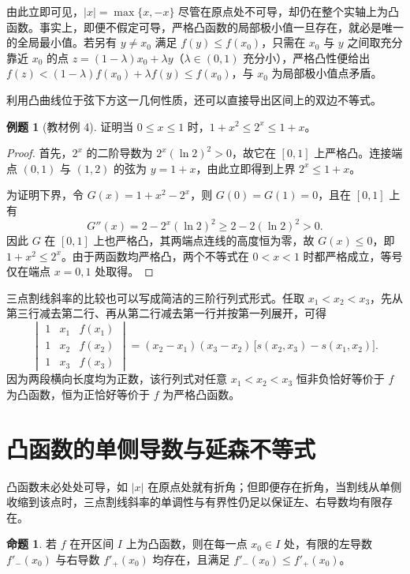\documentclass[UTF8,fontset=fandol,a4paper,12pt]{ctexart}
\theoremstyle{definition}
\newtheorem{proposition}[theorem]{命题}
\newtheorem{example}[theorem]{例题}
\begin{document}
由此立即可见，$|x|=\max\{x,-x\}$ 尽管在原点处不可导，却仍在整个实轴上为凸函数。事实上，即便不假定可导，严格凸函数的局部极小值一旦存在，就必是唯一的全局最小值。若另有 $y\ne x_0$ 满足 $f(y)\le f(x_0)$，只需在 $x_0$ 与 $y$ 之间取充分靠近 $x_0$ 的点 $z=(1-\lambda)x_0+\lambda y$（$\lambda\in(0,1)$ 充分小），严格凸性便给出 $f(z)<(1-\lambda)f(x_0)+\lambda f(y)\le f(x_0)$，与 $x_0$ 为局部极小值点矛盾。

利用凸曲线位于弦下方这一几何性质，还可以直接导出区间上的双边不等式。

\begin{example}[教材例 4]
证明当 $0\le x\le1$ 时，$1+x^2\le 2^x\le 1+x$。
\end{example}

\begin{proof}
首先，$2^x$ 的二阶导数为 $2^x(\ln 2)^2>0$，故它在 $[0,1]$ 上严格凸。连接端点 $(0,1)$ 与 $(1,2)$ 的弦为 $y=1+x$，由此立即得到上界 $2^x\le 1+x$。

为证明下界，令 $G(x)=1+x^2-2^x$，则 $G(0)=G(1)=0$，且在 $[0,1]$ 上有
\[
 G''(x)=2-2^x(\ln 2)^2\ge 2-2(\ln 2)^2>0.
\]
因此 $G$ 在 $[0,1]$ 上也严格凸，其两端点连线的高度恒为零，故 $G(x)\le0$，即 $1+x^2\le 2^x$。由于两函数均严格凸，两个不等式在 $0<x<1$ 时都严格成立，等号仅在端点 $x=0,1$ 处取得。
\end{proof}

三点割线斜率的比较也可以写成简洁的三阶行列式形式。任取 $x_1<x_2<x_3$，先从第三行减去第二行、再从第二行减去第一行并按第一列展开，可得
\[
 \begin{vmatrix}1&x_1&f(x_1)\\1&x_2&f(x_2)\\1&x_3&f(x_3)\end{vmatrix}
 =(x_2-x_1)(x_3-x_2)\,\bigl[s(x_2,x_3)-s(x_1,x_2)\bigr].
\]
因为两段横向长度均为正数，该行列式对任意 $x_1<x_2<x_3$ 恒非负恰好等价于 $f$ 为凸函数，恒为正恰好等价于 $f$ 为严格凸函数。

\section{凸函数的单侧导数与延森不等式}
凸函数未必处处可导，如 $|x|$ 在原点处就有折角；但即便存在折角，当割线从单侧收缩到该点时，三点割线斜率的单调性与有界性仍足以保证左、右导数均有限存在。

\begin{proposition}
若 $f$ 在开区间 $I$ 上为凸函数，则在每一点 $x_0\in I$ 处，有限的左导数 $f'_-(x_0)$ 与右导数 $f'_+(x_0)$ 均存在，且满足 $f'_-(x_0)\le f'_+(x_0)$。
\end{proposition}
\end{document}
